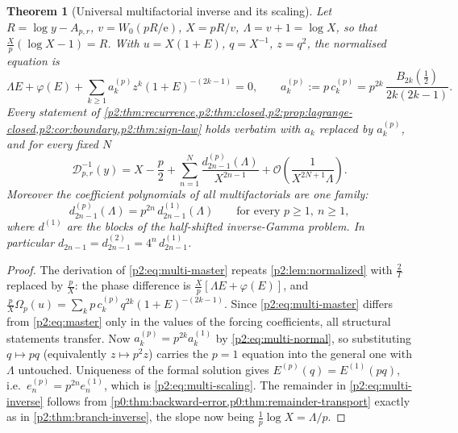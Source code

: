 \documentclass[11pt,a4paper,oneside]{book}
\theoremstyle{plain}
\newtheorem{theorem}{Theorem}[chapter]
\theoremstyle{definition}
\theoremstyle{remark}
\newcommand{\e}{\mathrm{e}}
\newcommand{\bigO}{\mathcal{O}}
\newcommand{\Wlam}{W}
\begin{document}
\begin{theorem}[Universal multifactorial inverse and its scaling]
\label{p2:thm:multi-scaling}
Let \(R=\log y-A_{p,r}\),
\(v=\Wlam_0(pR/\e)\), \(X=pR/v\), \(\Lambda=v+1=\log X\), so that
\(\tfrac Xp(\log X-1)=R\).  With \(u=X(1+E)\), \(q=X^{-1}\), \(z=q^2\), the
normalised equation is
\begin{equation}
 \Lambda E+\varphi(E)+\sum_{k\ge1}a^{(p)}_kz^k(1+E)^{-(2k-1)}=0,
 \qquad
 a^{(p)}_k:=p\,c^{(p)}_k=p^{2k}\,\frac{B_{2k}(\tfrac12)}{2k(2k-1)} .
 \label{p2:eq:multi-master}
\end{equation}
Every statement of
\cref{p2:thm:recurrence,p2:thm:closed,p2:prop:lagrange-closed,p2:cor:boundary,p2:thm:sign-law}
holds verbatim with \(a_k\) replaced by \(a^{(p)}_k\), and for every fixed
\(N\)
\begin{equation}
 \mathcal D_{p,r}^{-1}(y)=X-\frac p2
 +\sum_{n=1}^{N}\frac{d^{(p)}_{2n-1}(\Lambda)}{X^{2n-1}}
 +\bigO\!\left(\frac1{X^{2N+1}\Lambda}\right).
 \label{p2:eq:multi-inverse}
\end{equation}
Moreover the coefficient polynomials of all multifactorials are one family:
\begin{equation}
 \boxed{\;
 d^{(p)}_{2n-1}(\Lambda)=p^{2n}\,d^{(1)}_{2n-1}(\Lambda)
 \qquad\text{for every }p\ge1,\ n\ge1, \;}
 \label{p2:eq:multi-scaling}
\end{equation}
where \(d^{(1)}\) are the blocks of the half-shifted inverse-Gamma problem.  In
particular \(d_{2n-1}=d^{(2)}_{2n-1}=4^n\,d^{(1)}_{2n-1}\).
\end{theorem}

\begin{proof}
The derivation of \cref{p2:eq:multi-master} repeats
\cref{p2:lem:normalized} with \(\tfrac2T\) replaced by \(\tfrac pX\): the
phase difference is \(\tfrac Xp[\Lambda E+\varphi(E)]\), and
\(\tfrac pX\Omega_p(u)=\sum_kp\,c^{(p)}_kq^{2k}(1+E)^{-(2k-1)}\).  Since
\cref{p2:eq:multi-master} differs from \cref{p2:eq:master} only in the values
of the forcing coefficients, all structural statements transfer.  Now
\(a^{(p)}_k=p^{2k}a^{(1)}_k\) by \cref{p2:eq:multi-normal}, so substituting
\(q\mapsto pq\) (equivalently \(z\mapsto p^2z\)) carries the \(p=1\) equation
into the general one with \(\Lambda\) untouched.  Uniqueness of the formal
solution gives \(E^{(p)}(q)=E^{(1)}(pq)\), i.e.\
\(e^{(p)}_n=p^{2n}e^{(1)}_n\), which is \cref{p2:eq:multi-scaling}.  The
remainder in \cref{p2:eq:multi-inverse} follows from
\cref{p0:thm:backward-error,p0:thm:remainder-transport} exactly as in
\cref{p2:thm:branch-inverse}, the slope now being
\(\tfrac1p\log X=\Lambda/p\).
\end{proof}
\end{document}
